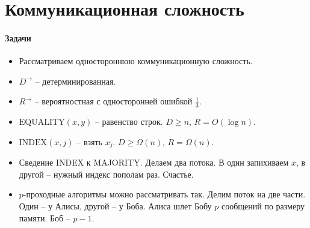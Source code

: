 \section{Коммуникационная сложность} %
\label{sec:communication_complexity}

\paragraph{Задачи} %
\label{par:problems}

\begin{itemize}
	\item Рассматриваем одностороннюю коммуникационную сложность. 
	\item $D^{\rightarrow}$ -- детерминированная.
	\item $R^{\rightarrow}$ -- вероятностная с односторонней ошибкой $\frac{1}{3}$.
	\item $\text{EQUALITY}(x, y)$ -- равенство строк. $D \geq n$, $R = O(\log n)$.
	\item $\text{INDEX}(x, j)$ -- взять $x_j$. $D \geq \Omega(n)$, $R = \Omega(n)$.
	\item Сведение INDEX к MAJORITY. Делаем два потока. В один запихиваем $x$, в другой -- нужный индекс пополам раз. Счастье.
	\item $p$-проходные алгоритмы можно рассматривать так. Делим поток на две части. Один -- у Алисы, другой -- у Боба. Алиса шлет Бобу $p$ сообщений по размеру памяти. Боб -- $p - 1$.
\end{itemize}


